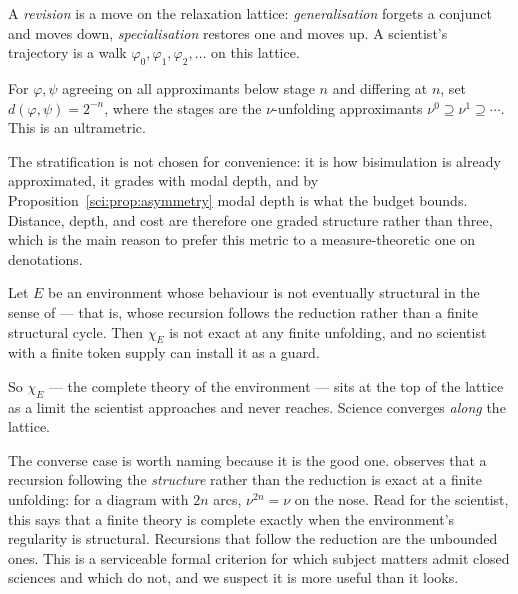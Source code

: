 \begin{definition}[Revision]\label{sci:revision}
A \emph{revision} is a move on the relaxation lattice: \emph{generalisation} forgets a conjunct and
moves down, \emph{specialisation} restores one and moves up. A scientist's trajectory is a walk
$\varphi_0, \varphi_1, \varphi_2, \ldots$ on this lattice.
\end{definition}

\begin{definition}\label{sci:stratified-distance}
For $\varphi, \psi$ agreeing on all approximants below stage $n$ and differing at $n$, set
$d(\varphi, \psi) = 2^{-n}$, where the stages are the $\nu$-unfolding approximants
$\nu^0 \supseteq \nu^1 \supseteq \cdots$. This is an ultrametric.
\end{definition}

The stratification is not chosen for convenience: it is how bisimulation is already approximated, it
grades with modal depth, and by Proposition~\ref{sci:prop:asymmetry} modal depth is what the budget
bounds. Distance, depth, and cost are therefore one graded structure rather than three, which is the
main reason to prefer this metric to a measure-theoretic one on denotations.

\begin{proposition}
\label{sci:prop:limit}
Let $E$ be an environment whose behaviour is not eventually structural in the sense of
\cite[Rem.~6]{ClassifierNote} --- that is, whose recursion follows the reduction rather than a finite
structural cycle. Then $\chi_E$ is not exact at any finite unfolding, and no scientist with a finite
token supply can install it as a guard.
\end{proposition}

So $\chi_E$ --- the complete theory of the environment --- sits at the top of the lattice as a limit
the scientist approaches and never reaches. Science converges \emph{along} the lattice.

\begin{remark}
\label{sci:rem:structural}
The converse case is worth naming because it is the good one. \cite[Rem.~6]{ClassifierNote} observes
that a recursion following the \emph{structure} rather than the reduction is exact at a finite
unfolding: for a diagram with $2n$ arcs, $\nu^{2n} = \nu$ on the nose. Read for the scientist, this
says that a finite theory is complete exactly when the environment's regularity is structural.
Recursions that follow the reduction are the unbounded ones. This is a serviceable formal criterion
for which subject matters admit closed sciences and which do not, and we suspect it is more useful
than it looks.
\end{remark}

